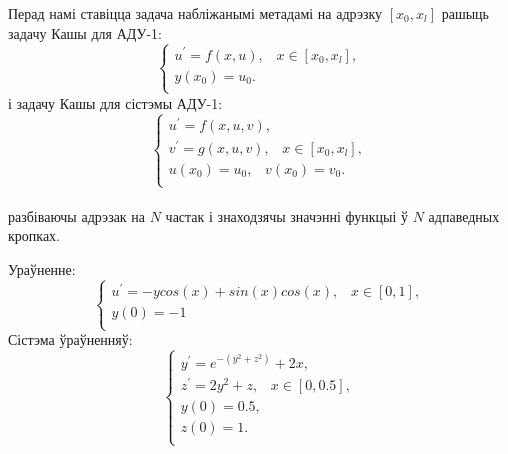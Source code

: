 Перад намі ставіцца задача набліжанымі метадамі на адрэзку $[x_0, x_l]$ рашыць задачу Кашы для АДУ-1:
\begin{equation}
    \begin{cases}
        u^{\prime} = f(x,u), \hspace{10pt} x \in [x_0, x_l],\\
        y(x_0) = u_0. \\
    \end{cases}
\end{equation}
і задачу Кашы для сістэмы АДУ-1:
\begin{equation}
    \begin{cases}
        u^{\prime} = f(x, u, v), \\
        v^{\prime} = g(x, u, v), \hspace{10pt} x \in [x_0, x_l],\\
        u(x_0) = u_0, \hspace{10pt} v(x_0) = v_0. \\
    \end{cases}
\end{equation} \\
разбіваючы адрэзак на $N$ частак і знаходзячы значэнні функцыі ў $N$ адпаведных кропках.\par
Ураўненне:\\
\begin{equation}
    \begin{cases}
        u^{\prime} = -y cos(x) + sin(x)cos(x), \hspace{10pt} x \in [0, 1],\\
        y(0) = -1 \\
    \end{cases}
\end{equation}
Сістэма ўраўненняў:
\begin{equation}
    \begin{cases}
        y^{\prime} = e ^{-(y^2+z^2)} + 2x, \\
        z^{\prime} = 2y^2 + z, \hspace{10pt} x \in [0, 0.5], \\
        y(0) = 0.5, \\
        z(0) = 1. \\
    \end{cases}
\end{equation}
